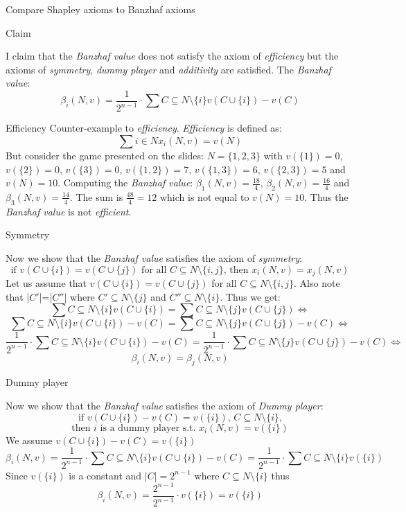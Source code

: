 \documentclass[12pt]{article}
\newenvironment{question}[2][Question]{\begin{trivlist}
\item[\hskip \labelsep {\bfseries #1}\hskip \labelsep {\bfseries #2.}]}{\end{trivlist}}
\newenvironment{answer}[2][Answer]{\begin{trivlist}
\item[\hskip \labelsep {\bfseries #1}\hskip \labelsep {\bfseries #2:}]}{\end{trivlist}}
\begin{document}
\begin{question}{2}
Compare Shapley axioms to Banzhaf axioms
\end{question}
\begin{answer}{a-d)}{Claim}

I claim that the \textit{Banzhaf value} does not satisfy the axiom of \textit{efficiency} but the axioms of \textit{symmetry}, \textit{dummy player} and \textit{additivity} are satisfied. The \textit{Banzhaf value}:
$$\beta_i(N,v)=\frac{1}{2^{n-1}}\cdot \sum{C \subseteq N \setminus \{i\}}{}{v(C \cup \{i\}) - v(C)}$$
\end{answer}

\begin{answer}{a)}{Efficiency}
Counter-example to \textit{efficiency}. \textit{Efficiency} is defined as: \\
$$\sum{i \in N}{}{x_i(N,v)=v(N)}$$
But consider the game presented on the slides: $N=\{1,2,3\}$ with $v(\{1\})=0$, $v(\{2\})=0$, $v(\{3\})=0$, $v(\{1,2\})=7$, $v(\{1,3\})=6$, $v(\{2,3\})=5$ and $v(N)=10$. Computing the \textit{Banzhaf value}: $\beta_1(N,v)=\frac{18}{4}$, $\beta_2(N,v)=\frac{16}{4}$ and $\beta_3(N,v)=\frac{14}{4}$. The sum is $\frac{48}{4}=12$ which is not equal to $v(N)=10$. Thus the \textit{Banzhaf value} is not \textit{efficient}.

\end{answer}
\begin{answer}{b)}{Symmetry}

Now we show that the \textit{Banzhaf value} satisfies the axiom of \textit{symmetry}:
$$\text{if }v(C \cup \{i\}) = v(C \cup \{j\}) \text{ for all } C \subseteq N \setminus \{i,j\} \text{, then } x_i(N,v)=x_j(N,v)$$
Let us assume that $v(C \cup \{i\}) = v(C \cup \{j\})$ for all $C \subseteq N \setminus \{i,j\}$.
Also note that |$C'$|=|$C''$| where $C' \subseteq N \setminus \{j\}$ and $C'' \subseteq N \setminus \{i\}$. Thus we get:
$$\sum{C \subseteq N \setminus \{i\}}{}{v(C \cup \{i\})}=\sum{C \subseteq N \setminus \{j\}}{}{v(C \cup \{j\})} \Leftrightarrow$$
$$\sum{C \subseteq N \setminus \{i\}}{}{v(C \cup \{i\})-v(C)}=\sum{C \subseteq N \setminus \{j\}}{}{v(C \cup \{j\})-v(C)} \Leftrightarrow$$
$$\frac{1}{2^{n-1}}\cdot\sum{C \subseteq N \setminus \{i\}}{}{v(C \cup \{i\})-v(C)}=\frac{1}{2^{n-1}}\cdot \sum{C \subseteq N \setminus \{j\}}{}{v(C \cup \{j\})-v(C)} \Leftrightarrow$$
$$\beta_i(N,v)=\beta_j(N,v)$$

\end{answer}
\begin{answer}{c)}{Dummy player}

Now we show that the \textit{Banzhaf value} satisfies the axiom of \textit{Dummy player}:
$$\text{if } v(C \cup \{i\})-v(C)=v(\{i\}) \text{, }C \subseteq N \setminus \{i\}\text{,}$$
$$\text{then } i \text{ is a dummy player s.t. } x_i(N,v)=v(\{i\})$$
We assume $v(C \cup \{i\})-v(C)=v(\{i\})$
$$\beta_i(N,v)=\frac{1}{2^{n-1}}\cdot \sum{C \subseteq N \setminus \{i\}}{}{v(C \cup \{i\}) - v(C)}=\frac{1}{2^{n-1}}\cdot \sum{C \subseteq N \setminus \{i\}}{}{v(\{i\})}$$
Since $v(\{i\})$ is a constant and |$C$|$=2^{n-1}$ where $C \subseteq N \setminus \{i\}$ thus
$$\beta_i(N,v)=\frac{2^{n-1}}{2^{n-1}}\cdot v(\{i\})=v(\{i\})$$

\end{answer}
\end{document}
